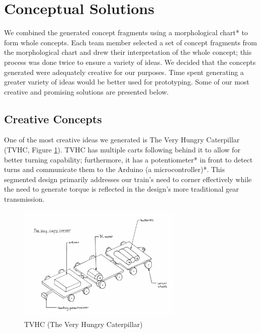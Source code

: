 \documentclass[class=../report, crop=false]{standalone}
\begin{document}
\section{Conceptual Solutions}

We combined the generated concept fragments using a morphological chart* to form whole concepts.
Each team member selected a set of concept fragments from the morphological chart and drew their interpretation of the whole concept; this process was done twice to ensure a variety of ideas.
We decided that the concepts generated were adequately creative for our purposes.
Time spent generating a greater variety of ideas would be better used for prototyping. Some of our most creative and promising solutions are presented below\footnotemark.



\subsection{Creative Concepts}

One of the most creative ideas we generated is The Very Hungry Caterpillar (TVHC, Figure \ref{fig:tvhc}).
TVHC has multiple carts following behind it to allow for better turning capability; furthermore, it has a potentiometer* in front to detect turns and communicate them to the Arduino (a microcontroller)*.
This segmented design primarily addresses our train’s need to corner effectively while the need to generate torque is reflected in the design’s more traditional gear transmission.

\begin{figure}[H]
	\centering
	\includegraphics[width=0.7\textwidth]{../res/img/tvhc}
	\caption{TVHC (The Very Hungry Caterpillar)}
	\label{fig:tvhc}
\end{figure}
\end{document}
